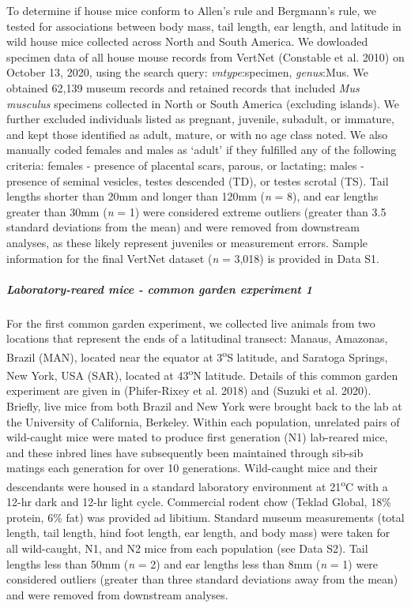 \documentclass[]{article}
\let\oldsubparagraph\subparagraph
\renewcommand{\subparagraph}[1]{\oldsubparagraph{#1}\mbox{}}
\begin{document}
To determine if house mice conform to Allen's rule and Bergmann's rule,
we tested for associations between body mass, tail length, ear length,
and latitude in wild house mice collected across North and South
America. We dowloaded specimen data of all house mouse records from
VertNet (Constable et al. 2010) on October 13, 2020, using the search
query: \emph{vntype}:specimen, \emph{genus}:Mus. We obtained 62,139
museum records and retained records that included \emph{Mus musculus}
specimens collected in North or South America (excluding islands). We
further excluded individuals listed as pregnant, juvenile, subadult, or
immature, and kept those identified as adult, mature, or with no age
class noted. We also manually coded females and males as `adult' if they
fulfilled any of the following criteria: females - presence of placental
scars, parous, or lactating; males - presence of seminal vesicles,
testes descended (TD), or testes scrotal (TS). Tail lengths shorter than
20mm and longer than 120mm (\emph{n} = 8), and ear lengths greater than
30mm (\emph{n} = 1) were considered extreme outliers (greater than 3.5
standard deviations from the mean) and were removed from downstream
analyses, as these likely represent juveniles or measurement errors.
Sample information for the final VertNet dataset (\emph{n} = 3,018) is
provided in Data S1.

\vspace{2.5mm}

\hypertarget{laboratory-reared-mice---common-garden-experiment-1}{%
\subparagraph{\texorpdfstring{\emph{Laboratory-reared mice - common
garden experiment
1}}{Laboratory-reared mice - common garden experiment 1}}\label{laboratory-reared-mice---common-garden-experiment-1}}

For the first common garden experiment, we collected live animals from
two locations that represent the ends of a latitudinal transect: Manaus,
Amazonas, Brazil (MAN), located near the equator at
3\textsuperscript{o}S latitude, and Saratoga Springs, New York, USA
(SAR), located at 43\textsuperscript{o}N latitude. Details of this
common garden experiment are given in (Phifer-Rixey et al. 2018) and
(Suzuki et al. 2020). Briefly, live mice from both Brazil and New York
were brought back to the lab at the University of California, Berkeley.
Within each population, unrelated pairs of wild-caught mice were mated
to produce first generation (N1) lab-reared mice, and these inbred lines
have subsequently been maintained through sib-sib matings each
generation for over 10 generations. Wild-caught mice and their
descendants were housed in a standard laboratory environment at
21\textsuperscript{o}C with a 12-hr dark and 12-hr light cycle.
Commercial rodent chow (Teklad Global, 18\% protein, 6\% fat) was
provided ad libitium. Standard museum measurements (total length, tail
length, hind foot length, ear length, and body mass) were taken for all
wild-caught, N1, and N2 mice from each population (see Data S2). Tail
lengths less than 50mm (\emph{n} = 2) and ear lengths less than 8mm
(\emph{n} = 1) were considered outliers (greater than three standard
deviations away from the mean) and were removed from downstream
analyses.
\end{document}
